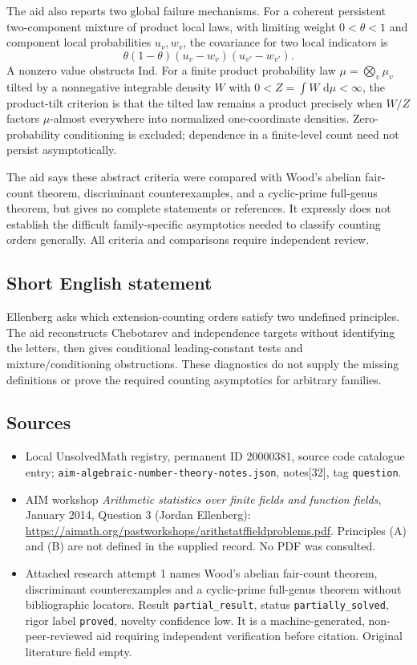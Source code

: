 \documentclass[11pt]{article}
\newcommand{\dd}{\,\mathrm{d}}
\begin{document}
The aid also reports two global failure mechanisms. For a coherent persistent two-component mixture of product local laws, with limiting weight $0<\theta<1$ and component local probabilities $u_v,w_v$, the covariance for two local indicators is
\[\theta(1-\theta)(u_v-w_v)(u_{v'}-w_{v'}).\]
A nonzero value obstructs Ind. For a finite product probability law $\mu=\bigotimes_v\mu_v$ tilted by a nonnegative integrable density $W$ with $0<Z=\int W\,\dd\mu<\infty$, the product-tilt criterion is that the tilted law remains a product precisely when $W/Z$ factors $\mu$-almost everywhere into normalized one-coordinate densities. Zero-probability conditioning is excluded; dependence in a finite-level count need not persist asymptotically.

The aid says these abstract criteria were compared with Wood's abelian fair-count theorem, discriminant counterexamples, and a cyclic-prime full-genus theorem, but gives no complete statements or references. It expressly does not establish the difficult family-specific asymptotics needed to classify counting orders generally. All criteria and comparisons require independent review.
\subsection{Short English statement}
Ellenberg asks which extension-counting orders satisfy two undefined principles. The aid reconstructs Chebotarev and independence targets without identifying the letters, then gives conditional leading-constant tests and mixture/conditioning obstructions. These diagnostics do not supply the missing definitions or prove the required counting asymptotics for arbitrary families.
\subsection{Sources}
\begin{itemize}
\item Local UnsolvedMath registry, permanent ID 20000381, source code catalogue entry; \texttt{aim-algebraic-number-theory-notes.json}, notes[32], tag \texttt{question}.
\item AIM workshop \emph{Arithmetic statistics over finite fields and function fields}, January 2014, Question 3 (Jordan Ellenberg): \url{https://aimath.org/pastworkshops/arithstatffieldproblems.pdf}. Principles (A) and (B) are not defined in the supplied record. No PDF was consulted.
\item Attached research attempt 1 names Wood's abelian fair-count theorem, discriminant counterexamples and a cyclic-prime full-genus theorem without bibliographic locators. Result \texttt{partial\_result}, status \texttt{partially\_solved}, rigor label \texttt{proved}, novelty confidence low. It is a machine-generated, non-peer-reviewed aid requiring independent verification before citation. Original literature field empty.
\end{itemize}
\end{document}
